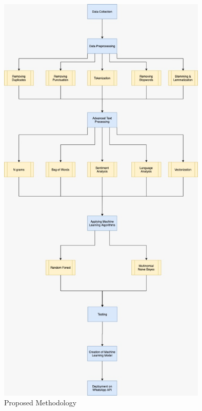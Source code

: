 \documentclass[runningheads]{llncs}
\begin{document}
\begin{figure}
\centering
\includegraphics[width=10cm]{proposedmethodology.jpeg}
\caption{Proposed Methodology} \label{fig1}
\end{figure}


\newpage
\end{document}
